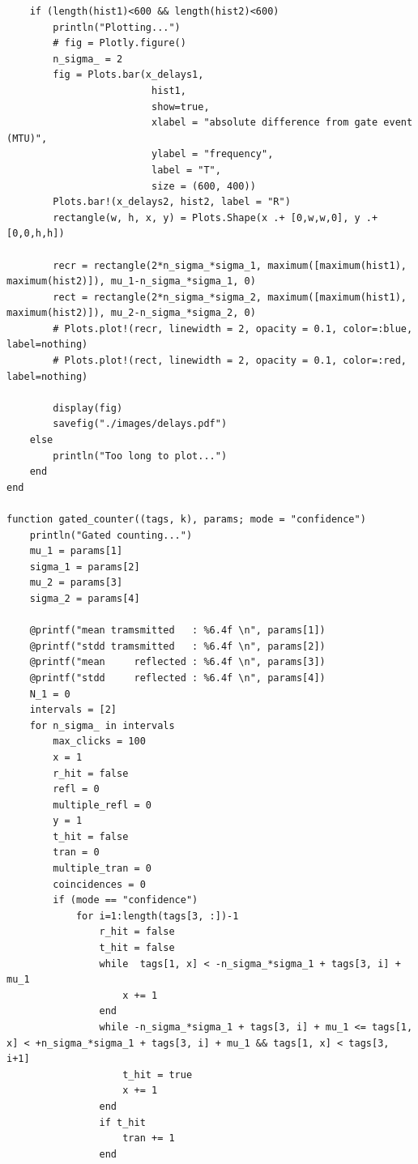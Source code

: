 \documentclass[10pt, final]{article}
\begin{document}
\begin{mdframed}
\begin{lstlisting}
    if (length(hist1)<600 && length(hist2)<600)
        println("Plotting...")
        # fig = Plotly.figure()
        n_sigma_ = 2
        fig = Plots.bar(x_delays1,
                         hist1,
                         show=true,
                         xlabel = "absolute difference from gate event (MTU)",
                         ylabel = "frequency", 
                         label = "T", 
                         size = (600, 400))
        Plots.bar!(x_delays2, hist2, label = "R")
        rectangle(w, h, x, y) = Plots.Shape(x .+ [0,w,w,0], y .+ [0,0,h,h])

        recr = rectangle(2*n_sigma_*sigma_1, maximum([maximum(hist1), maximum(hist2)]), mu_1-n_sigma_*sigma_1, 0)
        rect = rectangle(2*n_sigma_*sigma_2, maximum([maximum(hist1), maximum(hist2)]), mu_2-n_sigma_*sigma_2, 0)
        # Plots.plot!(recr, linewidth = 2, opacity = 0.1, color=:blue, label=nothing)
        # Plots.plot!(rect, linewidth = 2, opacity = 0.1, color=:red, label=nothing)

        display(fig)
        savefig("./images/delays.pdf")
    else
        println("Too long to plot...")
    end
end

function gated_counter((tags, k), params; mode = "confidence")
    println("Gated counting...")
    mu_1 = params[1]
    sigma_1 = params[2]
    mu_2 = params[3]
    sigma_2 = params[4]

    @printf("mean tramsmitted   : %6.4f \n", params[1])
    @printf("stdd tramsmitted   : %6.4f \n", params[2])
    @printf("mean     reflected : %6.4f \n", params[3])
    @printf("stdd     reflected : %6.4f \n", params[4])
    N_1 = 0
    intervals = [2]
    for n_sigma_ in intervals
        max_clicks = 100
        x = 1
        r_hit = false
        refl = 0
        multiple_refl = 0
        y = 1
        t_hit = false
        tran = 0
        multiple_tran = 0
        coincidences = 0
        if (mode == "confidence") 
            for i=1:length(tags[3, :])-1
                r_hit = false
                t_hit = false  
                while  tags[1, x] < -n_sigma_*sigma_1 + tags[3, i] + mu_1
                    x += 1
                end
                while -n_sigma_*sigma_1 + tags[3, i] + mu_1 <= tags[1, x] < +n_sigma_*sigma_1 + tags[3, i] + mu_1 && tags[1, x] < tags[3, i+1] 
                    t_hit = true
                    x += 1
                end
                if t_hit
                    tran += 1
                end


\end{lstlisting}
\end{mdframed}
\end{document}
